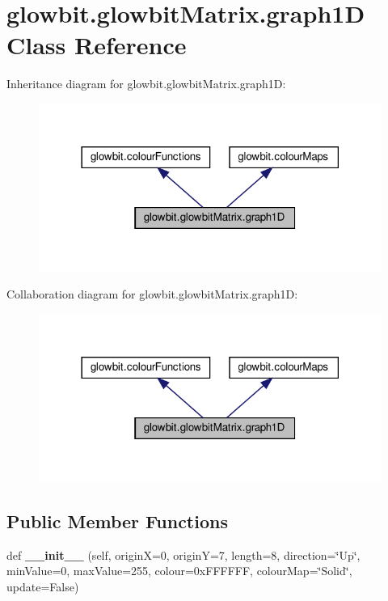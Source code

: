 \hypertarget{classglowbit_1_1glowbitMatrix_1_1graph1D}{}\section{glowbit.\+glowbit\+Matrix.\+graph1D Class Reference}
\label{classglowbit_1_1glowbitMatrix_1_1graph1D}


Inheritance diagram for glowbit.\+glowbit\+Matrix.\+graph1D\+:\nopagebreak
\begin{figure}[H]
\begin{center}
\leavevmode
\includegraphics[width=318pt]{classglowbit_1_1glowbitMatrix_1_1graph1D__inherit__graph}
\end{center}
\end{figure}


Collaboration diagram for glowbit.\+glowbit\+Matrix.\+graph1D\+:\nopagebreak
\begin{figure}[H]
\begin{center}
\leavevmode
\includegraphics[width=318pt]{classglowbit_1_1glowbitMatrix_1_1graph1D__coll__graph}
\end{center}
\end{figure}
\subsection*{Public Member Functions}
\begin{DoxyCompactItemize}
\item 
\mbox{\label{classglowbit_1_1glowbitMatrix_1_1graph1D_aafb789a57fe97ce1625bfb486400b2a1}} 
def {\bfseries \+\_\+\+\_\+init\+\_\+\+\_\+} (self, originX=0, originY=7, length=8, direction=\char`\"{}Up\char`\"{}, min\+Value=0, max\+Value=255, colour=0x\+F\+F\+F\+F\+F\+F, colour\+Map=\char`\"{}\+Solid\char`\"{}, update=\+False)
\end{DoxyCompactItemize}
